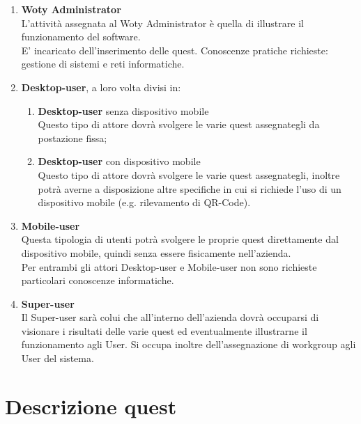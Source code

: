 \begin{enumerate}

\item \textbf{Woty Administrator}\\
L'attività assegnata al Woty Administrator è quella di illustrare il funzionamento del software.\\
E' incaricato dell'inserimento delle quest. Conoscenze pratiche richieste: gestione di sistemi e reti informatiche.

\item \textbf{Desktop-user}, a loro volta divisi in:

\begin{enumerate}

\item \textbf{Desktop-user} senza dispositivo mobile\\
Questo tipo di attore dovrà svolgere le varie quest assegnategli da postazione fissa;

\item \textbf{Desktop-user} con dispositivo mobile\\
Questo tipo di attore dovrà svolgere le varie quest assegnategli, inoltre potrà averne a disposizione altre specifiche in cui si richiede l'uso di un dispositivo mobile (e.g. rilevamento di QR-Code).

\end{enumerate}

\item \textbf{Mobile-user}\\
Questa tipologia di utenti potrà svolgere le proprie quest direttamente dal dispositivo mobile, quindi senza essere fisicamente nell'azienda.\\
Per entrambi gli attori Desktop-user e Mobile-user non sono richieste particolari conoscenze informatiche.

\item \textbf{Super-user}\\
Il Super-user sarà colui che all'interno dell'azienda dovrà occuparsi di visionare i risultati delle varie quest ed eventualmente illustrarne il funzionamento agli User. Si occupa inoltre dell'assegnazione di workgroup agli User del sistema.

\end{enumerate}

\newpage

\section{Descrizione quest}

